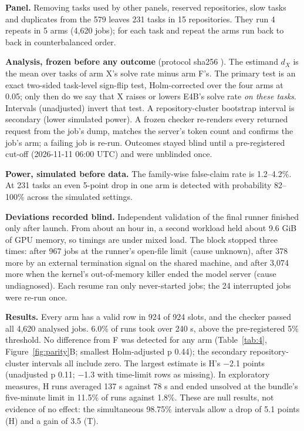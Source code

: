 \textbf{Panel.} Removing tasks used by other panels, reserved repositories, slow tasks and duplicates from the 579 leaves 231 tasks in 15 repositories. They run 4 repeats in 5 arms (4,620 jobs); for each task and repeat the arms run back to back in counterbalanced order.

\textbf{Analysis, frozen before any outcome} (protocol sha256 \texttt{}). The estimand $d_X$ is the mean over tasks of arm X's solve rate minus arm F's. The primary test is an exact two-sided task-level sign-flip test, Holm-corrected over the four arms at 0.05; only then do we say that X raises or lowers E4B's solve rate \emph{on these tasks}. Intervals (unadjusted) invert that test. A repository-cluster bootstrap interval is secondary (lower simulated power). A frozen checker re-renders every returned request from the job's dump, matches the server's token count and confirms the job's arm; a failing job is re-run. Outcomes stayed blind until a pre-registered cut-off (2026-11-11 06:00 UTC) and were unblinded once.

\textbf{Power, simulated before data.} The family-wise false-claim rate is 1.2--4.2\%. At 231 tasks an even 5-point drop in one arm is detected with probability 82--100\% across the simulated settings.

\textbf{Deviations recorded blind.} Independent validation of the final runner finished only after launch. From about an hour in, a second workload held about 9.6 GiB of GPU memory, so timings are under mixed load. The block stopped three times: after 967 jobs at the runner's open-file limit (cause unknown), after 378 more by an external termination signal on the shared machine, and after 3,074 more when the kernel's out-of-memory killer ended the model server (cause undiagnosed). Each resume ran only never-started jobs; the 24 interrupted jobs were re-run once.

\textbf{Results.} Every arm has a valid row in 924 of 924 slots, and the checker passed all 4,620 analysed jobs. 6.0\% of runs took over 240 s, above the pre-registered 5\% threshold. No difference from F was detected for any arm (Table~\ref{tab:4}, Figure~\ref{fig:parity}B; smallest Holm-adjusted p 0.44); the secondary repository-cluster intervals all include zero. The largest estimate is H's \ensuremath{-}2.1 points (unadjusted p 0.11; \ensuremath{-}1.3 with time-limit rows as missing). In exploratory measures, H runs averaged 137 s against 78 s and ended unsolved at the bundle's five-minute limit in 11.5\% of runs against 1.8\%. These are null results, not evidence of no effect: the simultaneous 98.75\% intervals allow a drop of 5.1 points (H) and a gain of 3.5 (T).

